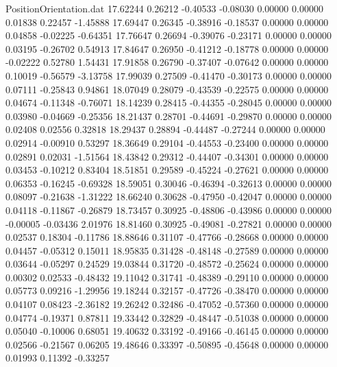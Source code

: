 \begin{filecontents}{PositionOrientation.dat}
  17.62244    0.26212   -0.40533    -0.08030    0.00000    0.00000    0.01838    0.22457   -1.45888
  17.69447    0.26345   -0.38916    -0.18537    0.00000    0.00000    0.04858   -0.02225   -0.64351
  17.76647    0.26694   -0.39076    -0.23171    0.00000    0.00000    0.03195   -0.26702    0.54913
  17.84647    0.26950   -0.41212    -0.18778    0.00000    0.00000   -0.02222    0.52780    1.54431
  17.91858    0.26790   -0.37407    -0.07642    0.00000    0.00000    0.10019   -0.56579   -3.13758
  17.99039    0.27509   -0.41470    -0.30173    0.00000    0.00000    0.07111   -0.25843    0.94861
  18.07049    0.28079   -0.43539    -0.22575    0.00000    0.00000    0.04674   -0.11348   -0.76071
  18.14239    0.28415   -0.44355    -0.28045    0.00000    0.00000    0.03980   -0.04669   -0.25356
  18.21437    0.28701   -0.44691    -0.29870    0.00000    0.00000    0.02408    0.02556    0.32818
  18.29437    0.28894   -0.44487    -0.27244    0.00000    0.00000    0.02914   -0.00910    0.53297
  18.36649    0.29104   -0.44553    -0.23400    0.00000    0.00000    0.02891    0.02031   -1.51564
  18.43842    0.29312   -0.44407    -0.34301    0.00000    0.00000    0.03453   -0.10212    0.83404
  18.51851    0.29589   -0.45224    -0.27621    0.00000    0.00000    0.06353   -0.16245   -0.69328
  18.59051    0.30046   -0.46394    -0.32613    0.00000    0.00000    0.08097   -0.21638   -1.31222
  18.66240    0.30628   -0.47950    -0.42047    0.00000    0.00000    0.04118   -0.11867   -0.26879
  18.73457    0.30925   -0.48806    -0.43986    0.00000    0.00000   -0.00005   -0.03436    2.01976
  18.81460    0.30925   -0.49081    -0.27821    0.00000    0.00000    0.02537    0.18304   -0.11786
  18.88646    0.31107   -0.47766    -0.28668    0.00000    0.00000    0.04457   -0.05312    0.15011
  18.95835    0.31428   -0.48148    -0.27589    0.00000    0.00000    0.03644   -0.05297    0.24529
  19.03844    0.31720   -0.48572    -0.25624    0.00000    0.00000    0.00302    0.02533   -0.48432
  19.11042    0.31741   -0.48389    -0.29110    0.00000    0.00000    0.05773    0.09216   -1.29956
  19.18244    0.32157   -0.47726    -0.38470    0.00000    0.00000    0.04107    0.08423   -2.36182
  19.26242    0.32486   -0.47052    -0.57360    0.00000    0.00000    0.04774   -0.19371    0.87811
  19.33442    0.32829   -0.48447    -0.51038    0.00000    0.00000    0.05040   -0.10006    0.68051
  19.40632    0.33192   -0.49166    -0.46145    0.00000    0.00000    0.02566   -0.21567    0.06205
  19.48646    0.33397   -0.50895    -0.45648    0.00000    0.00000    0.01993    0.11392   -0.33257

\end{filecontents}

